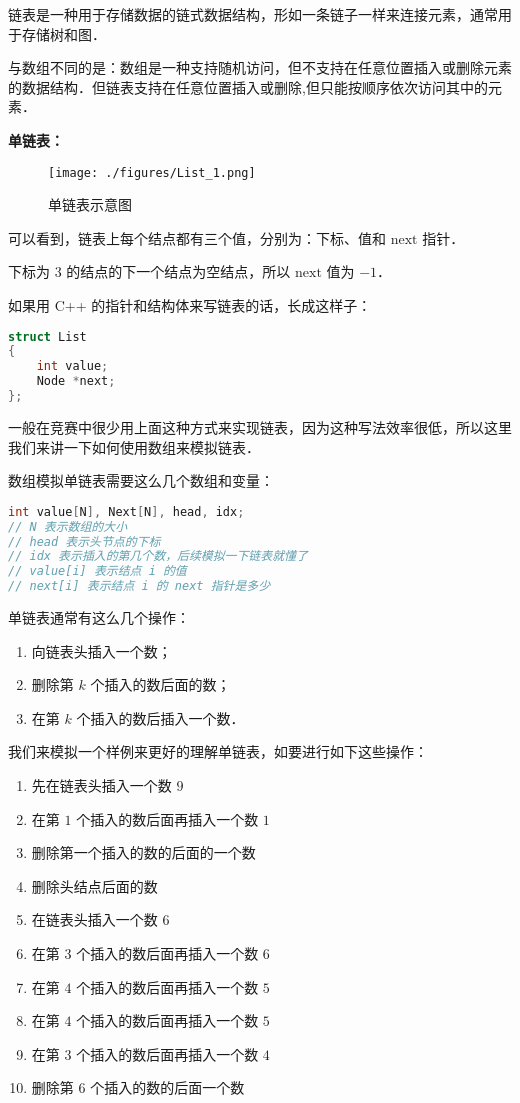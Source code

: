 
链表是一种用于存储数据的链式数据结构，形如一条链子一样来连接元素，通常用于存储树和图．

与数组不同的是：数组是一种支持随机访问，但不支持在任意位置插入或删除元素的数据结构．但链表支持在任意位置插入或删除,但只能按顺序依次访问其中的元素．

\textbf{单链表：}

\begin{figure}[ht]
\centering
\texttt{[image: ./figures/List\_1.png]}
\caption{单链表示意图} \label{List_fig1}
\end{figure}

可以看到，链表上每个结点都有三个值，分别为：下标、值和 $\text{next}$ 指针．

下标为 $3$ 的结点的下一个结点为空结点，所以 $\text{next}$ 值为 $-1$．

如果用 C++ 的指针和结构体来写链表的话，长成这样子：
\begin{lstlisting}[language=cpp]
struct List
{
    int value;
    Node *next;
};
\end{lstlisting}

一般在竞赛中很少用上面这种方式来实现链表，因为这种写法效率很低，所以这里我们来讲一下如何使用数组来模拟链表．

数组模拟单链表需要这么几个数组和变量：
\begin{lstlisting}[language=cpp]
int value[N], Next[N], head, idx;
// N 表示数组的大小
// head 表示头节点的下标
// idx 表示插入的第几个数，后续模拟一下链表就懂了
// value[i] 表示结点 i 的值
// next[i] 表示结点 i 的 next 指针是多少
\end{lstlisting}

单链表通常有这么几个操作：
\begin{enumerate}
\item 向链表头插入一个数；
\item 删除第 $k$ 个插入的数后面的数；
\item 在第 $k$ 个插入的数后插入一个数．
\end{enumerate}

我们来模拟一个样例来更好的理解单链表，如要进行如下这些操作：

\begin{enumerate}
\item 先在链表头插入一个数 $9$
\item 在第 $1$ 个插入的数后面再插入一个数 $1$
\item 删除第一个插入的数的后面的一个数
\item 删除头结点后面的数
\item 在链表头插入一个数 $6$
\item 在第 $3$ 个插入的数后面再插入一个数 $6$
\item 在第 $4$ 个插入的数后面再插入一个数 $5$
\item 在第 $4$ 个插入的数后面再插入一个数 $5$
\item 在第 $3$ 个插入的数后面再插入一个数 $4$
\item 删除第 $6$ 个插入的数的后面一个数
\end{enumerate}

